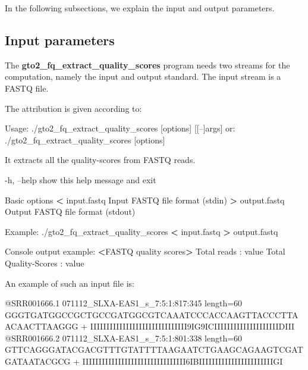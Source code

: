 \documentclass[11pt,]{krantz}
\newenvironment{Shaded}{\begin{snugshade}}{\end{snugshade}}
\newcommand{\OperatorTok}[1]{\textcolor[rgb]{0.43,0.43,0.43}{\textbf{#1}}}
\newcommand{\ExtensionTok}[1]{#1}
\newcommand{\NormalTok}[1]{#1}
\begin{document}
In the following subsections, we explain the input and output
parameters.

\subsection*{Input parameters}\label{input-parameters-3}


The \textbf{gto2\_fq\_extract\_quality\_scores} program needs two
streams for the computation, namely the input and output standard. The
input stream is a FASTQ file.

The attribution is given according to:

\begin{Shaded}
\begin{Highlighting}[]
\ExtensionTok{Usage}\NormalTok{: ./gto2_fq_extract_quality_scores [options] [[--]args]}
   \ExtensionTok{or}\NormalTok{: ./gto2_fq_extract_quality_scores [options]}

\ExtensionTok{It}\NormalTok{ extracts all the quality-scores from FASTQ reads.}

    \ExtensionTok{-h}\NormalTok{, --help            show this help message and exit}

\ExtensionTok{Basic}\NormalTok{ options}
    \OperatorTok{<} \ExtensionTok{input.fastq}\NormalTok{         Input FASTQ file format (stdin)}
    \OperatorTok{>} \ExtensionTok{output.fastq}\NormalTok{        Output FASTQ file format (stdout)}

\ExtensionTok{Example}\NormalTok{: ./gto2_fq_extract_quality_scores }\OperatorTok{<}\NormalTok{ input.fastq }\OperatorTok{>}
\ExtensionTok{output.fastq}

\ExtensionTok{Console}\NormalTok{ output example:}
\OperatorTok{<}\ExtensionTok{FASTQ}\NormalTok{ quality scores}\OperatorTok{>}
\ExtensionTok{Total}\NormalTok{ reads          : value}
\ExtensionTok{Total}\NormalTok{ Quality-Scores : value}
\end{Highlighting}
\end{Shaded}

An example of such an input file is:

\begin{Shaded}
\begin{Highlighting}[]
\ExtensionTok{@SRR001666.1}\NormalTok{ 071112_SLXA-EAS1_s_7:5:1:817:345 length=60}
\ExtensionTok{GGGTGATGGCCGCTGCCGATGGCGTCAAATCCCACCAAGTTACCCTTAACAACTTAAGGG}
\ExtensionTok{+}
\ExtensionTok{IIIIIIIIIIIIIIIIIIIIIIIIIIIIII9IG9ICIIIIIIIIIIIIIIIIIIIIDIII}
\ExtensionTok{@SRR001666.2}\NormalTok{ 071112_SLXA-EAS1_s_7:5:1:801:338 length=60}
\ExtensionTok{GTTCAGGGATACGACGTTTGTATTTTAAGAATCTGAAGCAGAAGTCGATGATAATACGCG}
\ExtensionTok{+}
\ExtensionTok{IIIIIIIIIIIIIIIIIIIIIIIIIIIIIIII6IBIIIIIIIIIIIIIIIIIIIIIIIGI}
\end{Highlighting}
\end{Shaded}
\end{document}
